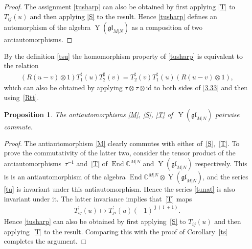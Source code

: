 \documentclass[pdftex]{sigma}
\numberwithin{equation}{section}
\newtheorem{Proposition}[Theorem]{Proposition}
\def\1{^{-1}}
\def\bi{{\bar\imath }}
\def\bj{{\bar\jmath }}
\def\CC{{\mathbb{C}}}
\def\CMN{\CC^{M|N}}
\def\End{\operatorname{End}}
\def\glMN{\mathfrak{gl}_{M|N}}
\def\id{{\mathrm{id}}}
\def\ot{\otimes}
\def\TP{T^{\prime}}
\def\TS{T^{\sharp}}
\def\YMN{\operatorname{Y}(\glMN)}
\begin{document}
\begin{proof}
The assignment \eqref{tusharp} can also be obtained by first applying
\eqref{T} to $T_{ij}(u)$ and then applying \eqref{S} to the result.
Hence \eqref{tusharp} defines an automorphism of the algebra
$\YMN$ as a composition of two antiautomorphisms.
\end{proof}

By the definition \eqref{tsu} the homomorphism property of %
\eqref{tusharp} is equivalent to the relation
\begin{gather}
\label{3.333}
(R (u-v)\ot1) \TS_1(u) \TS_2(v)=
\TS_2(v) \TS_1(u)(R (u-v)\ot1),
\end{gather}
which can also be obtained by applying
$\tau\ot\tau\ot\id$ to both sides of \eqref{3.33}
and then using~\eqref{Rtt}.

\begin{Proposition}\label{mst}
The antiautomorphisms \eqref{M}, \eqref{S}, \eqref{T} of~$\YMN$ pairwise commute.
\end{Proposition}

\begin{proof}The antiautomorphism \eqref{M} clearly commutes with either of~\eqref{S},~\eqref{T}.
To prove the commutativity of the latter two, consider the tensor product of the antiautomorphisms~$\tau\1$ and~\eqref{T}
of $\End\CMN$ and $\YMN$ respectively. This is
is an antiautomorphism of the
algebra $\End\CMN\ot\YMN $, and the series \eqref{tu} is invariant
under this antiautomorphism. Hence the series \eqref{tunat}
is also invariant under it.
The latter invariance implies that~\eqref{T} maps
\begin{gather*}%
\TP_{ij}(u)\mapsto\TP_{ji}(u) {(-1)}^{\bj ( \bi + 1)} .
\end{gather*}
Hence \eqref{tusharp} can also be obtained by first applying~\eqref{S} to $T_{ij}(u)$ and then applying~\eqref{T} to the result.
Comparing this with the proof of Corollary~\ref{ts} completes the argument.
\end{proof}
\end{document}
